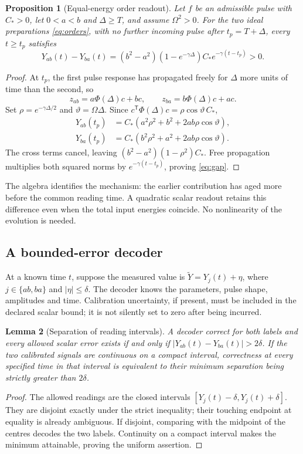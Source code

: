 \documentclass[11pt,a4paper]{article}
\newtheorem{proposition}{Proposition}[section]
\newtheorem{lemma}[proposition]{Lemma}
\theoremstyle{remark}
\begin{document}
\begin{proposition}[Equal-energy order readout]
\label{prop:order}
Let $f$ be an admissible pulse with $C_*>0$, let $0<a<b$ and
$\Delta\ge T$, and assume $\Omega^2>0$. For the two ideal preparations
\eqref{eq:orders}, with no further incoming pulse after $t_p=T+\Delta$,
every $t\ge t_p$ satisfies
\begin{equation}
 Y_{ab}(t)-Y_{ba}(t)
 =(b^2-a^2)(1-e^{-\gamma\Delta})C_*
      e^{-\gamma(t-t_p)}>0.
 \label{eq:gap}
\end{equation}
\end{proposition}
\begin{proof}
At $t_p$, the first pulse response has propagated freely for $\Delta$
more units of time than the second, so
\[
 z_{ab}=a\Phi(\Delta)c+bc,\qquad
 z_{ba}=b\Phi(\Delta)c+ac.
\]
Set $\rho=e^{-\gamma\Delta/2}$ and $\vartheta=\Omega\Delta$.
Since $c^{\mathsf T}\Phi(\Delta)c=\rho\cos\vartheta\,C_*$,
\begin{align*}
 Y_{ab}(t_p)&=C_*(a^2\rho^2+b^2+2ab\rho\cos\vartheta),\\
 Y_{ba}(t_p)&=C_*(b^2\rho^2+a^2+2ab\rho\cos\vartheta).
\end{align*}
The cross terms cancel, leaving $(b^2-a^2)(1-\rho^2)C_*$.
Free propagation multiplies both squared norms by
$e^{-\gamma(t-t_p)}$, proving \eqref{eq:gap}.
\end{proof}

The algebra identifies the mechanism: the earlier contribution has aged
more before the common reading time. A quadratic scalar readout retains
this difference even when the total input energies coincide. No
nonlinearity of the evolution is needed.

\subsection{A bounded-error decoder}

At a known time $t$, suppose the measured value is
$\widetilde Y=Y_j(t)+\eta$, where $j\in\{ab,ba\}$ and $|\eta|\le\delta$.
The decoder knows the parameters, pulse shape, amplitudes and time.
Calibration uncertainty, if present, must be included in the declared
scalar bound; it is not silently set to zero after being incurred.

\begin{lemma}[Separation of reading intervals]
\label{lem:decoder}
A decoder correct for both labels and every allowed scalar error exists
if and only if $|Y_{ab}(t)-Y_{ba}(t)|>2\delta$. If the two calibrated
signals are continuous on a compact interval, correctness at every
specified time in that interval is equivalent to their minimum
separation being strictly greater than $2\delta$.
\end{lemma}
\begin{proof}
The allowed readings are the closed intervals
$[Y_j(t)-\delta,Y_j(t)+\delta]$. They are disjoint exactly under the
strict inequality; their touching endpoint at equality is already
ambiguous. If disjoint, comparing with the midpoint of the centres
decodes the two labels. Continuity on a compact interval makes the
minimum attainable, proving the uniform assertion.
\end{proof}
\end{document}
